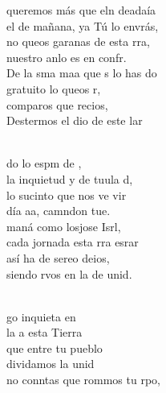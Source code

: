 \documentclass[12pt]{article}
\begin{document}
\begin{multicols*}{2}
\begin{cancion}%
	 queremos más que eln deadaía\\
	el de mañana, ya Tú lo envrás,\\
	no queos garanas de esta rra, \\
	nuestro anlo es en confr.\\
	De la sma maa que s lo has do\\
	gratuito lo queos r,\\
	comparos  que recios,\\
	Destermos el dio de este lar\\\jump\\
	\begin{chorus}%
	do lo espm de ,\\
	la inquietud y de tuula d,\\
	lo sucinto que nos ve vir\\
	día aa, camndon tue. \\
	 maná como losjose Isrl,\\
	cada jornada esta rra esrar\\
	así ha de sereo deios,\\
	siendo rvos en la de  unid.\\
	\end{chorus}%
	\jump\\
	go inquieta en \\
	la a  esta Tierra\\
que entre tu pueblo \\
	dividamos la unid\\
	no conntas que rommos tu rpo,\\

\end{cancion}
\end{multicols*}
\end{document}
